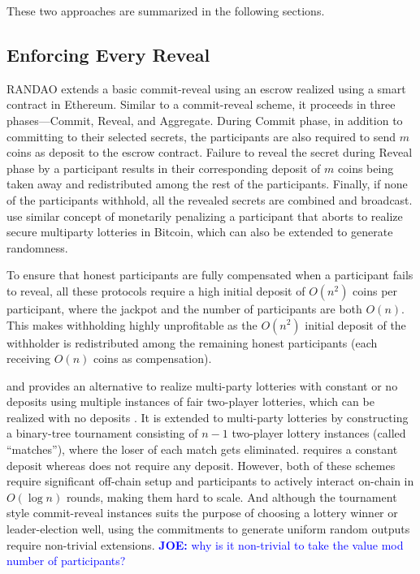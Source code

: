 \documentclass[letterpaper,twocolumn,10pt]{article}
\theoremstyle{definition}
\theoremstyle{remark}
\newcommand{\joenote}[1]{\textcolor{blue}{\textbf{JOE:} #1}}
\begin{document}
These two approaches are summarized in the following sections.
\subsection{Enforcing Every Reveal}
RANDAO \cite{youcai2017randao} extends a basic commit-reveal using an escrow realized using a smart contract in Ethereum. Similar to a commit-reveal scheme, it proceeds in three phases---Commit, Reveal, and Aggregate. During Commit phase, in addition to committing to their selected secrets, the participants are also required to send $m$ coins as deposit to the escrow contract. Failure to reveal the secret during Reveal phase by a participant results in their corresponding deposit of $m$ coins being taken away and redistributed among the rest of the participants. Finally, if none of the participants withhold, all the revealed secrets are combined and broadcast. \cite{andrychowicz2014secure, bentov2014use} use similar concept of monetarily penalizing a participant that aborts to realize secure multiparty lotteries in Bitcoin, which can also be extended to generate randomness. 

To ensure that honest participants are fully compensated when a participant fails to reveal, all these protocols require a high initial deposit of $O(n^2)$ coins per participant, where the jackpot and the number of participants are both $O(n)$. This makes withholding highly unprofitable as the $O(n^2)$ initial deposit of the withholder is redistributed among the remaining honest participants (each receiving $O(n)$ coins as compensation). 

\cite{bartoletti2017constant} and \cite{miller2017zero} provides an alternative to realize multi-party lotteries with constant or no deposits using multiple instances of fair two-player lotteries, which can be realized with no deposits \cite{andrychowicz2014fair, andrychowicz2014secure}. It is extended to multi-party lotteries by constructing a binary-tree tournament consisting of $n-1$ two-player lottery instances (called ``matches''), where the loser of each match gets eliminated. \cite{bartoletti2017constant} requires a constant deposit whereas \cite{miller2017zero} does not require any deposit. However, both of these schemes require significant off-chain setup and participants to actively interact on-chain in $O(\log n)$ rounds, making them hard to scale. And although the tournament style commit-reveal instances suits the purpose of choosing a lottery winner or leader-election well, using the commitments to generate uniform random outputs require non-trivial extensions.
\joenote{why is it non-trivial to take the value mod number of participants?}
\end{document}

